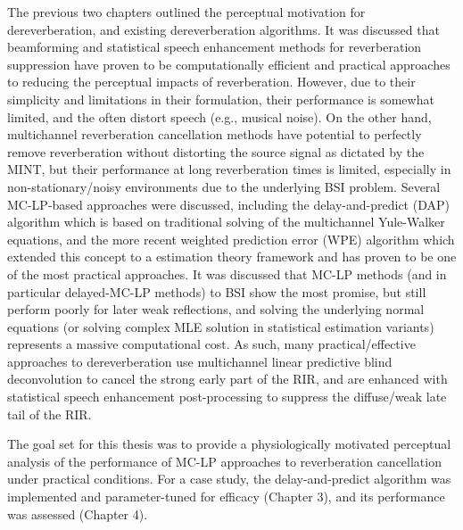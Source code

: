 The previous two chapters outlined the perceptual motivation for dereverberation, and existing dereverberation algorithms. It was discussed that beamforming and statistical speech enhancement methods for reverberation suppression have proven to be computationally efficient and practical approaches to reducing the perceptual impacts of reverberation. However, due to their simplicity and limitations in their formulation, their performance is somewhat limited, and the often distort speech (e.g., musical noise). On the other hand, multichannel reverberation cancellation methods have potential to perfectly remove reverberation without distorting the source signal as dictated by the MINT, but their performance at long reverberation times is limited, especially in non-stationary/noisy environments due to the underlying BSI problem. Several MC-LP-based approaches were discussed, including the delay-and-predict (DAP) algorithm \citep{triki2006delay} which is based on traditional solving of the multichannel Yule-Walker equations, and the more recent weighted prediction error (WPE) algorithm \citep{nakatani2008blind, nakatani2010speech} which extended this concept to a estimation theory framework and has proven to be one of the most practical approaches. It was discussed that MC-LP methods (and in particular delayed-MC-LP methods) to BSI show the most promise, but still perform poorly for later weak reflections, and solving the underlying normal equations (or solving complex MLE solution in statistical estimation variants) represents a massive computational cost. As such, many practical/effective approaches to dereverberation use multichannel linear predictive blind deconvolution to cancel the strong early part of the RIR, and are enhanced with statistical speech enhancement post-processing to suppress the diffuse/weak late tail of the RIR.

The goal set for this thesis was to provide a physiologically motivated perceptual analysis of the performance of MC-LP approaches to reverberation cancellation under practical conditions. For a case study, the delay-and-predict algorithm was implemented and parameter-tuned for efficacy (Chapter 3), and its performance was assessed (Chapter 4). 